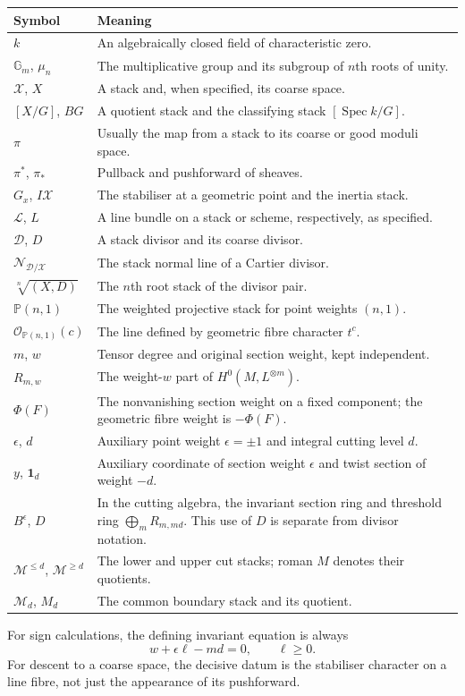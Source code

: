 \documentclass[11pt,a4paper]{article}
\numberwithin{equation}{section}
\theoremstyle{definition}
\newcommand{\PP}{\mathbb P}
\newcommand{\Gm}{\mathbb G_m}
\newcommand{\OO}{\mathcal O}
\newcommand{\cX}{\mathcal X}
\newcommand{\cD}{\mathcal D}
\newcommand{\cL}{\mathcal L}
\newcommand{\cM}{\mathcal M}
\newcommand{\Spec}{\operatorname{Spec}}
\newcommand{\one}{\mathbf 1}
\newcommand{\normal}{\mathcal N}
\begin{document}
\begin{longtable}{@{}p{}p{}@{}}
\toprule
Symbol & Meaning\\
\midrule
\endhead
$k$ & An algebraically closed field of characteristic zero.\\
$\Gm$, $\mu_n$ & The multiplicative group and its subgroup of $n$th roots of unity.\\
$\cX$, $X$ & A stack and, when specified, its coarse space.\\
$[X/G]$, $BG$ & A quotient stack and the classifying stack $[\Spec k/G]$.\\
$\pi$ & Usually the map from a stack to its coarse or good moduli space.\\
$\pi^*$, $\pi_*$ & Pullback and pushforward of sheaves.\\
$G_x$, $I\cX$ & The stabiliser at a geometric point and the inertia stack.\\
$\cL$, $L$ & A line bundle on a stack or scheme, respectively, as specified.\\
$\cD$, $D$ & A stack divisor and its coarse divisor.\\
$\normal_{\cD/\cX}$ & The stack normal line of a Cartier divisor.\\
$\sqrt[n]{(X,D)}$ & The $n$th root stack of the divisor pair.\\
$\PP(n,1)$ & The weighted projective stack for point weights $(n,1)$.\\
$\OO_{\PP(n,1)}(c)$ & The line defined by geometric fibre character $t^c$.\\
$m$, $w$ & Tensor degree and original section weight, kept independent.\\
$R_{m,w}$ & The weight-$w$ part of $H^0(M,L^{\otimes m})$.\\
$\Phi(F)$ & The nonvanishing section weight on a fixed component; the geometric fibre weight is $-\Phi(F)$.\\
$\epsilon$, $d$ & Auxiliary point weight $\epsilon=\pm1$ and integral cutting level $d$.\\
$y$, $\one_d$ & Auxiliary coordinate of section weight $\epsilon$ and twist section of weight $-d$.\\
$B^\epsilon$, $D$ & In the cutting algebra, the invariant section ring and threshold ring $\bigoplus_mR_{m,md}$. This use of $D$ is separate from divisor notation.\\
$\cM^{\le d}$, $\cM^{\ge d}$ & The lower and upper cut stacks; roman $M$ denotes their quotients.\\
$\cM_d$, $M_d$ & The common boundary stack and its quotient.\\
\bottomrule
\end{longtable}

For sign calculations, the defining invariant equation is always
\[
 w+\epsilon\ell-md=0,\qquad \ell\ge0.
\]
For descent to a coarse space, the decisive datum is the stabiliser
character on a line fibre, not just the appearance of its pushforward.
\end{document}

